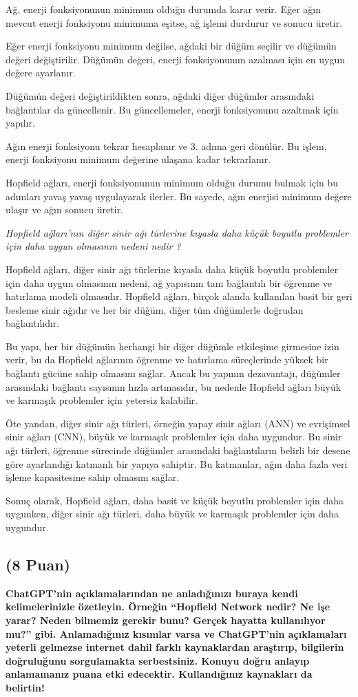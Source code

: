 \documentclass[11pt]{article}
\begin{document}
Ağ, enerji fonksiyonunun minimum olduğu durumda karar verir. Eğer ağın mevcut enerji fonksiyonu minimuma eşitse, ağ işlemi durdurur ve sonucu üretir.

Eğer enerji fonksiyonu minimum değilse, ağdaki bir düğüm seçilir ve düğümün değeri değiştirilir. Düğümün değeri, enerji fonksiyonunun azalması için en uygun değere ayarlanır.

Düğümün değeri değiştirildikten sonra, ağdaki diğer düğümler arasındaki bağlantılar da güncellenir. Bu güncellemeler, enerji fonksiyonunu azaltmak için yapılır.

Ağın enerji fonksiyonu tekrar hesaplanır ve 3. adıma geri dönülür. Bu işlem, enerji fonksiyonu minimum değerine ulaşana kadar tekrarlanır.

Hopfield ağları, enerji fonksiyonunun minimum olduğu durumu bulmak için bu adımları yavaş yavaş uygulayarak ilerler. Bu sayede, ağın enerjisi minimum değere ulaşır ve ağın sonucu üretir.

\textit{Hopfield ağları'nın diğer sinir ağı türlerine kıyasla daha küçük boyutlu problemler için daha uygun olmasının nedeni nedir ?}

Hopfield ağları, diğer sinir ağı türlerine kıyasla daha küçük boyutlu problemler için daha uygun olmasının nedeni, ağ yapısının tam bağlantılı bir öğrenme ve hatırlama modeli olmasıdır. Hopfield ağları, birçok alanda kullanılan basit bir geri besleme sinir ağıdır ve her bir düğüm, diğer tüm düğümlerle doğrudan bağlantılıdır.

Bu yapı, her bir düğümün herhangi bir diğer düğümle etkileşime girmesine izin verir, bu da Hopfield ağlarının öğrenme ve hatırlama süreçlerinde yüksek bir bağlantı gücüne sahip olmasını sağlar. Ancak bu yapının dezavantajı, düğümler arasındaki bağlantı sayısının hızla artmasıdır, bu nedenle Hopfield ağları büyük ve karmaşık problemler için yetersiz kalabilir.

Öte yandan, diğer sinir ağı türleri, örneğin yapay sinir ağları (ANN) ve evrişimsel sinir ağları (CNN), büyük ve karmaşık problemler için daha uygundur. Bu sinir ağı türleri, öğrenme sürecinde düğümler arasındaki bağlantıların belirli bir desene göre ayarlandığı katmanlı bir yapıya sahiptir. Bu katmanlar, ağın daha fazla veri işleme kapasitesine sahip olmasını sağlar.

Sonuç olarak, Hopfield ağları, daha basit ve küçük boyutlu problemler için daha uygunken, diğer sinir ağı türleri, daha büyük ve karmaşık problemler için daha uygundur.

\subsection{(8 Puan)} \textbf{ChatGPT’nin açıklamalarından ne anladığınızı buraya kendi kelimelerinizle özetleyin. Örneğin ``Hopfield Network nedir? Ne işe yarar? Neden bilmemiz gerekir bunu? Gerçek hayatta kullanılıyor mu?'' gibi. Anlamadığınız kısımlar varsa ve ChatGPT’nin açıklamaları yeterli gelmezse internet dahil farklı kaynaklardan araştırıp, bilgilerin doğruluğunu sorgulamakta serbestsiniz. Konuyu doğru anlayıp anlamamanız puana etki edecektir. Kullandığınız kaynakları da belirtin!}
\end{document}
